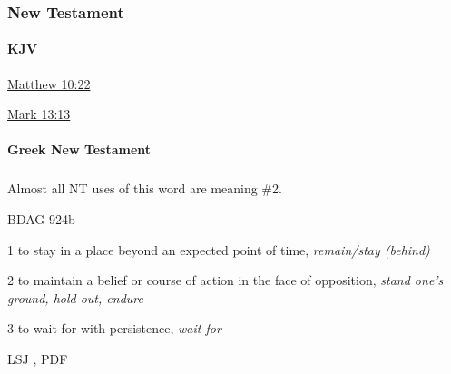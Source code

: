 	\subsubsection{New Testament} %
		\label{ENDURE-NT}
	
		\paragraph{KJV}
			\label{ENDURE-NT-KJV}
			
	
			
			\begin{compactdesc}
				\item[{\hyperref[MATTHEW-10-22]{Matthew 10:22}}]
				\item[{\hyperref[MARK-13-13]{Mark 13:13}}]
			\end{compactdesc}
			
		\paragraph{Greek New Testament}
			\label{ENDURE-GREEK}
		
			\subparagraph{\texorpdfstring{}{}}
				\label{HUPOMENO}
			
				Almost all NT uses of this word are meaning \#2.
			
				\begin{compactdesc}
					\item[BDAG 924b] \textbf{}
						\begin{compactitem}
							\item[1] to stay in a place beyond an expected point of time, \textit{remain/stay (behind)}
							\item[2] to maintain a belief or course of action in the face of opposition, \textit{stand one's ground, hold out, endure}
							\item[3] to wait for with persistence, \textit{wait for}
						\end{compactitem}
					\item[LSJ , PDF ] \textbf{}
						\begin{compactitem}
							\item 
						\end{compactitem}
				\end{compactdesc}
				
